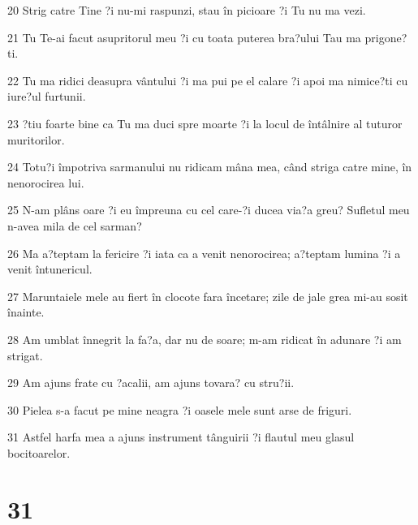 \par 20 Strig catre Tine ?i nu-mi raspunzi, stau în picioare ?i Tu nu ma vezi.
\par 21 Tu Te-ai facut asupritorul meu ?i cu toata puterea bra?ului Tau ma prigone?ti.
\par 22 Tu ma ridici deasupra vântului ?i ma pui pe el calare ?i apoi ma nimice?ti cu iure?ul furtunii.
\par 23 ?tiu foarte bine ca Tu ma duci spre moarte ?i la locul de întâlnire al tuturor muritorilor.
\par 24 Totu?i împotriva sarmanului nu ridicam mâna mea, când striga catre mine, în nenorocirea lui.
\par 25 N-am plâns oare ?i eu împreuna cu cel care-?i ducea via?a greu? Sufletul meu n-avea mila de cel sarman?
\par 26 Ma a?teptam la fericire ?i iata ca a venit nenorocirea; a?teptam lumina ?i a venit întunericul.
\par 27 Maruntaiele mele au fiert în clocote fara încetare; zile de jale grea mi-au sosit înainte.
\par 28 Am umblat înnegrit la fa?a, dar nu de soare; m-am ridicat în adunare ?i am strigat.
\par 29 Am ajuns frate cu ?acalii, am ajuns tovara? cu stru?ii.
\par 30 Pielea s-a facut pe mine neagra ?i oasele mele sunt arse de friguri.
\par 31 Astfel harfa mea a ajuns instrument tânguirii ?i flautul meu glasul bocitoarelor.

\chapter{31}

